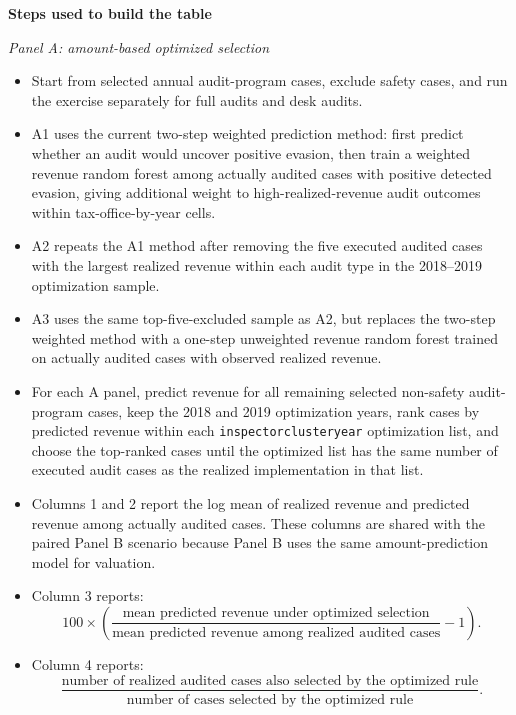 \documentclass{article}
\begin{document}
\noindent\textbf{Steps used to build the table}
\medskip

\noindent\textit{Panel A: amount-based optimized selection}
\begin{itemize}
\item Start from selected annual audit-program cases, exclude safety cases, and run the exercise separately for full audits and desk audits.
\item A1 uses the current two-step weighted prediction method: first predict whether an audit would uncover positive evasion, then train a weighted revenue random forest among actually audited cases with positive detected evasion, giving additional weight to high-realized-revenue audit outcomes within tax-office-by-year cells.
\item A2 repeats the A1 method after removing the five executed audited cases with the largest realized revenue within each audit type in the 2018--2019 optimization sample.
\item A3 uses the same top-five-excluded sample as A2, but replaces the two-step weighted method with a one-step unweighted revenue random forest trained on actually audited cases with observed realized revenue.
\item For each A panel, predict revenue for all remaining selected non-safety audit-program cases, keep the 2018 and 2019 optimization years, rank cases by predicted revenue within each \texttt{inspectorclusteryear} optimization list, and choose the top-ranked cases until the optimized list has the same number of executed audit cases as the realized implementation in that list.
\item Columns 1 and 2 report the log mean of realized revenue and predicted revenue among actually audited cases. These columns are shared with the paired Panel B scenario because Panel B uses the same amount-prediction model for valuation.
\item Column 3 reports:
$$
100 \times \left(
\frac{\text{mean predicted revenue under optimized selection}}
{\text{mean predicted revenue among realized audited cases}}
- 1
\right).
$$
\item Column 4 reports:
$$
\frac{\text{number of realized audited cases also selected by the optimized rule}}
{\text{number of cases selected by the optimized rule}}.
$$
\end{itemize}
\end{document}
